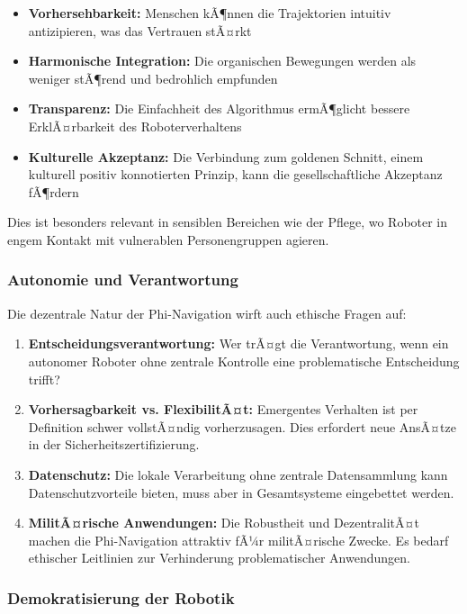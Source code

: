 ﻿\documentclass[a4paper,12pt]{article}
\theoremstyle{definition}
\begin{document}
\begin{itemize}
	\item \textbf{Vorhersehbarkeit:} Menschen kÃ¶nnen die Trajektorien intuitiv antizipieren, was das Vertrauen stÃ¤rkt
	\item \textbf{Harmonische Integration:} Die organischen Bewegungen werden als weniger stÃ¶rend und bedrohlich empfunden
	\item \textbf{Transparenz:} Die Einfachheit des Algorithmus ermÃ¶glicht bessere ErklÃ¤rbarkeit des Roboterverhaltens
	\item \textbf{Kulturelle Akzeptanz:} Die Verbindung zum goldenen Schnitt, einem kulturell positiv konnotierten Prinzip, kann die gesellschaftliche Akzeptanz fÃ¶rdern
\end{itemize}

Dies ist besonders relevant in sensiblen Bereichen wie der Pflege, wo Roboter in engem Kontakt mit vulnerablen Personengruppen agieren.

\subsubsection{Autonomie und Verantwortung}

Die dezentrale Natur der Phi-Navigation wirft auch ethische Fragen auf:

\begin{enumerate}
	\item \textbf{Entscheidungsverantwortung:} Wer trÃ¤gt die Verantwortung, wenn ein autonomer Roboter ohne zentrale Kontrolle eine problematische Entscheidung trifft?
	
	\item \textbf{Vorhersagbarkeit vs. FlexibilitÃ¤t:} Emergentes Verhalten ist per Definition schwer vollstÃ¤ndig vorherzusagen. Dies erfordert neue AnsÃ¤tze in der Sicherheitszertifizierung.
	
	\item \textbf{Datenschutz:} Die lokale Verarbeitung ohne zentrale Datensammlung kann Datenschutzvorteile bieten, muss aber in Gesamtsysteme eingebettet werden.
	
	\item \textbf{MilitÃ¤rische Anwendungen:} Die Robustheit und DezentralitÃ¤t machen die Phi-Navigation attraktiv fÃ¼r militÃ¤rische Zwecke. Es bedarf ethischer Leitlinien zur Verhinderung problematischer Anwendungen.
\end{enumerate}

\subsubsection{Demokratisierung der Robotik}
\end{document}
